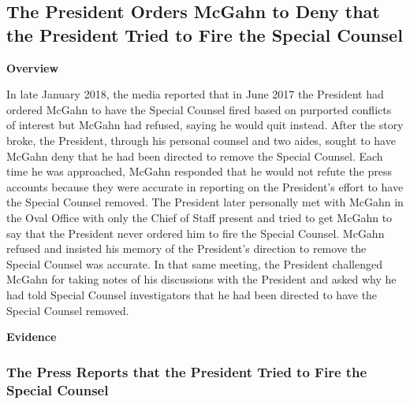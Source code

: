 \subsection{The President Orders McGahn to Deny that the President Tried to Fire the Special Counsel}

\begin{center}
\textbf{Overview}
\end{center}

In late January 2018, the media reported that in June 2017 the President had ordered McGahn to have the Special Counsel fired based on purported conflicts of interest but McGahn had refused, saying he would quit instead.
After the story broke, the President, through his personal counsel and two aides, sought to have McGahn deny that he had been directed to remove the Special Counsel.
Each time he was approached, McGahn responded that he would not refute the press accounts because they were accurate in reporting on the President's effort to have the Special Counsel removed.
The President later personally met with McGahn in the Oval Office with only the Chief of Staff present and tried to get McGahn to say that the President never ordered him to fire the Special Counsel.
McGahn refused and insisted his memory of the President's direction to remove the Special Counsel was accurate.
In that same meeting, the President challenged McGahn for taking notes of his discussions with the President and asked why he had told Special Counsel investigators that he had been directed to have the Special Counsel removed.

\begin{center}
\textbf{Evidence}
\end{center}

\subsubsection{The Press Reports that the President Tried to Fire the Special Counsel}

